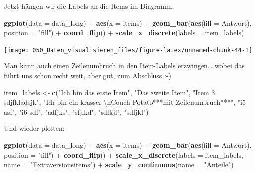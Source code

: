 \documentclass[12pt,]{book}
\makeatletter
\newenvironment{Shaded}{\begin{snugshade}}{\end{snugshade}}
\newcommand{\KeywordTok}[1]{\textcolor[rgb]{0.13,0.29,0.53}{\textbf{{#1}}}}
\newcommand{\DataTypeTok}[1]{\textcolor[rgb]{0.13,0.29,0.53}{{#1}}}
\newcommand{\CharTok}[1]{\textcolor[rgb]{0.31,0.60,0.02}{{#1}}}
\newcommand{\StringTok}[1]{\textcolor[rgb]{0.31,0.60,0.02}{{#1}}}
\newcommand{\NormalTok}[1]{{#1}}
\newenvironment{kframe}{%
\medskip{}
\setlength{\fboxsep}{.8em}
 \def\at@end@of@kframe{}%
 \ifinner\ifhmode%
  \def\at@end@of@kframe{\end{minipage}}%
  \begin{minipage}{\columnwidth}%
 \fi\fi%
 \def\FrameCommand##1{\hskip\@totalleftmargin \hskip-\fboxsep
 \colorbox{shadecolor}{##1}\hskip-\fboxsep
     \hskip-\linewidth \hskip-\@totalleftmargin \hskip\columnwidth}%
 \MakeFramed {\advance\hsize-\width
   \@totalleftmargin\z@ \linewidth\hsize
   \@setminipage}}%
 {\par\unskip\endMakeFramed%
 \at@end@of@kframe}
\renewenvironment{Shaded}{\begin{kframe}}{\end{kframe}}
\makeatother
\begin{document}
Jetzt hängen wir die Labels an die Items im Diagramm:

\begin{Shaded}
\begin{Highlighting}[]
\KeywordTok{ggplot}\NormalTok{(}\DataTypeTok{data =} \NormalTok{data_long) +}
\StringTok{  }\KeywordTok{aes}\NormalTok{(}\DataTypeTok{x =} \NormalTok{items)  +}
\StringTok{  }\KeywordTok{geom_bar}\NormalTok{(}\KeywordTok{aes}\NormalTok{(}\DataTypeTok{fill =} \NormalTok{Antwort), }\DataTypeTok{position =} \StringTok{"fill"}\NormalTok{) +}
\StringTok{  }\KeywordTok{coord_flip}\NormalTok{() +}
\StringTok{  }\KeywordTok{scale_x_discrete}\NormalTok{(}\DataTypeTok{labels =} \NormalTok{item_labels)}
\end{Highlighting}
\end{Shaded}

\begin{center}\texttt{[image: 050\_Daten\_visualisieren\_files/figure-latex/unnamed-chunk-44-1]} \end{center}

Man kann auch einen Zeilenumbruch in den Item-Labels erzwingen\ldots{}
wobei das führt uns schon recht weit, aber gut, zum Abschluss :-)

\begin{Shaded}
\begin{Highlighting}[]
\NormalTok{item_labels <-}\StringTok{ }\KeywordTok{c}\NormalTok{(}\StringTok{"Ich bin das erste Item"}\NormalTok{,}
                 \StringTok{"Das zweite Item"}\NormalTok{,}
                 \StringTok{"Item 3 sdjfkladsjk"}\NormalTok{,}
                 \StringTok{"Ich bin ein krasser }\CharTok{\textbackslash{}n}\StringTok{Couch-Potato***mit Zeilenumbruch***"}\NormalTok{,}
\StringTok{"i5 asf"}\NormalTok{, }\StringTok{"i6 sdf"}\NormalTok{, }\StringTok{"adfjks"}\NormalTok{, }\StringTok{"sfjlkd"}\NormalTok{, }\StringTok{"sdfkjl"}\NormalTok{, }\StringTok{"sdfjkl"}\NormalTok{)}
\end{Highlighting}
\end{Shaded}

Und wieder plotten:

\begin{Shaded}
\begin{Highlighting}[]
\KeywordTok{ggplot}\NormalTok{(}\DataTypeTok{data =} \NormalTok{data_long) +}
\StringTok{  }\KeywordTok{aes}\NormalTok{(}\DataTypeTok{x =} \NormalTok{items)  +}
\StringTok{  }\KeywordTok{geom_bar}\NormalTok{(}\KeywordTok{aes}\NormalTok{(}\DataTypeTok{fill =} \NormalTok{Antwort), }\DataTypeTok{position =} \StringTok{"fill"}\NormalTok{) +}
\StringTok{  }\KeywordTok{coord_flip}\NormalTok{() +}
\StringTok{  }\KeywordTok{scale_x_discrete}\NormalTok{(}\DataTypeTok{labels =} \NormalTok{item_labels, }\DataTypeTok{name =} \StringTok{"Extraversionsitems"}\NormalTok{) +}
\StringTok{  }\KeywordTok{scale_y_continuous}\NormalTok{(}\DataTypeTok{name =} \StringTok{"Anteile"}\NormalTok{)}
\end{Highlighting}
\end{Shaded}
\end{document}
